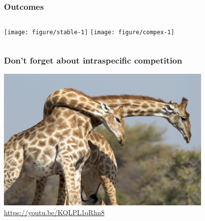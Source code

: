 \documentclass[color=usenames,dvipsnames]{beamer}\usepackage[]{graphicx}\usepackage[]{color}
\begin{document}




\begin{frame}
  \frametitle{Outcomes}
  \vspace{-1cm}


\begin{columns}
  \column{\dimexpr\paperwidth-10pt}
    \texttt{[image: figure/stable-1]}
    \texttt{[image: figure/compex-1]}
\end{columns}
\end{frame}


\begin{frame}
  \frametitle{Don't forget about intraspecific competition}
  \centering 
  \includegraphics[width=0.8\textwidth]{figs/giraffe} \\
  \url{
    https://youtu.be/KQLPL1qRhn8
  }
\end{frame}
\end{document}
